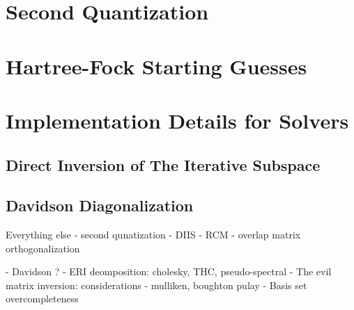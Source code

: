 \appendix
\chapter{Second Quantization}

\chapter{Hartree-Fock Starting Guesses \label{app:SCFGUESS}}

\chapter{Implementation Details for Solvers}

\section{Direct Inversion of The Iterative Subspace \label{sec:DIIS}}

\section{Davidson Diagonalization \label{sec:DAV}}

Everything else
- second qunatization
- DIIS 
- RCM
- overlap matrix orthogonalization

- Davidson ? 
- ERI deomposition: cholesky, THC, pseudo-spectral
- The evil matrix inversion: considerations
- mulliken, boughton pulay
- Basis set overcompleteness